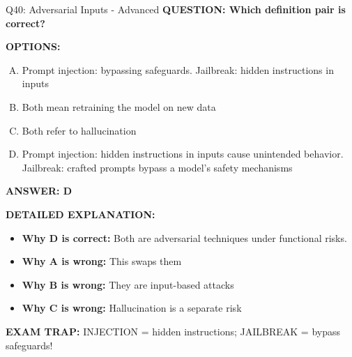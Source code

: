 \documentclass[8pt]{beamer}
\begin{document}
\begin{frame}[shrink=6]{Q40: Adversarial Inputs - Advanced}
\fontsize{6.5}{7.5}\selectfont
\textbf{QUESTION: Which definition pair is correct?}

\vspace{0.1cm}
\textbf{OPTIONS:}
\begin{enumerate}[A.]
\item Prompt injection: bypassing safeguards. Jailbreak: hidden instructions in inputs
\item Both mean retraining the model on new data
\item Both refer to hallucination
\item Prompt injection: hidden instructions in inputs cause unintended behavior. Jailbreak: crafted prompts bypass a model's safety mechanisms
\end{enumerate}

\vspace{0.1cm}
\textcolor{myblue}{\textbf{ANSWER: D}}

\vspace{0.1cm}
\textbf{DETAILED EXPLANATION:}
\begin{itemize}
\item \textbf{Why D is correct:} Both are adversarial techniques under functional risks.
\item \textbf{Why A is wrong:} This swaps them
\item \textbf{Why B is wrong:} They are input-based attacks
\item \textbf{Why C is wrong:} Hallucination is a separate risk
\end{itemize}

\textcolor{myred}{\textbf{EXAM TRAP:}} INJECTION = hidden instructions; JAILBREAK = bypass safeguards!
\end{frame}
\end{document}
